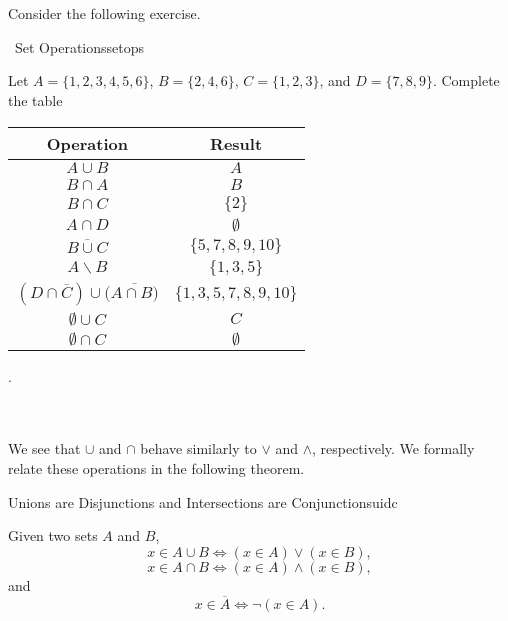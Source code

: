         \pagebreak
        \vphantom
        \\
        \\
        Consider the following exercise.
        \begin{exercise}{\Difficulty\,\Difficulty\,\,Set Operations}{setops}
        
            Let \(A=\{1,2,3,4,5,6\}\), \(B=\{2,4,6\}\), \(C=\{1,2,3\}\), and \(D=\{7,8,9\}\). Complete the table
            \begin{center}
                \begin{tabular}{c|c}
                    \hline
                    Operation & Result \\
                    \hline
                    \(A\cup B\) & \(A\) \\
                    \(B\cap A\) & \(B\) \\
                    \(B\cap C\) & \(\{2\}\) \\
                    \(A\cap D\) & \(\emptyset\) \\
                    \(\overline{B\cup C}\) & \(\{5,7,8,9,10\}\) \\
                    \(A\backslash B\) & \(\{1,3,5\}\)\\
                    \((D\cap\overline{C})\cup(\overline{A\cap B)}\) & \(\{1,3,5,7,8,9,10\}\) \\
                    \(\emptyset \cup C\) & \(C\)\\
                    \(\emptyset \cap C\) & \(\emptyset\)\\
                    \hline
                \end{tabular}.
            \end{center}
            
        \end{exercise}
        \vphantom
        \\
        \\
        We see that \(\cup\) and \(\cap\) behave similarly to \(\vee\) and \(\wedge\), respectively. We formally relate these operations in the following theorem.
        \begin{theorem}{Unions are Disjunctions and Intersections are Conjunctions}{uidc}
        
            Given two sets \(A\) and \(B\),
            \begin{equation*}
                x\in A\cup B\iff (x\in A)\vee(x\in B),
            \end{equation*}
            \begin{equation*}
                x\in A\cap B\iff (x\in A)\wedge(x\in B),
            \end{equation*}
            and
            \begin{equation*}
                x\in\overline{A}\iff\neg(x\in A).
            \end{equation*}
        
        \end{theorem}
        
